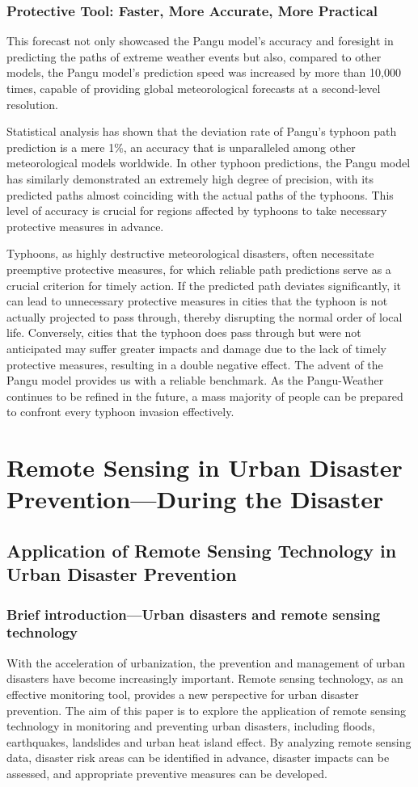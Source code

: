 \documentclass[conference]{IEEEtran}
\begin{document}
\subsubsection{Protective Tool: Faster, More Accurate, More Practical}
This forecast not only showcased the Pangu model's accuracy and foresight in predicting the paths of extreme weather events but also, compared to other models, the Pangu model's prediction speed was increased by more than 10,000 times, capable of providing global meteorological forecasts at a second-level resolution.

Statistical analysis has shown that the deviation rate of Pangu's typhoon path prediction is a mere 1\%, an accuracy that is unparalleled among other meteorological models worldwide. In other typhoon predictions, the Pangu model has similarly demonstrated an extremely high degree of precision, with its predicted paths almost coinciding with the actual paths of the typhoons. This level of accuracy is crucial for regions affected by typhoons to take necessary protective measures in advance.

Typhoons, as highly destructive meteorological disasters, often necessitate preemptive protective measures, for which reliable path predictions serve as a crucial criterion for timely action. If the predicted path deviates significantly, it can lead to unnecessary protective measures in cities that the typhoon is not actually projected to pass through, thereby disrupting the normal order of local life. Conversely, cities that the typhoon does pass through but were not anticipated may suffer greater impacts and damage due to the lack of timely protective measures, resulting in a double negative effect. The advent of the Pangu model provides us with a reliable benchmark. As the Pangu-Weather continues to be refined in the future, a mass majority of people can be prepared to confront every typhoon invasion effectively.

\section{\textbf{Remote Sensing in Urban Disaster Prevention---During the Disaster}}
\subsection{Application of Remote Sensing Technology in Urban Disaster Prevention}
\subsubsection{Brief introduction---Urban disasters and remote sensing technology}
With the acceleration of urbanization, the prevention and management of urban disasters have become increasingly important. Remote sensing technology, as an effective monitoring tool, provides a new perspective for urban disaster prevention. The aim of this paper is to explore the application of remote sensing technology in monitoring and preventing urban disasters, including floods, earthquakes, landslides and urban heat island effect. By analyzing remote sensing data, disaster risk areas can be identified in advance, disaster impacts can be assessed, and appropriate preventive measures can be developed. 
\end{document}
